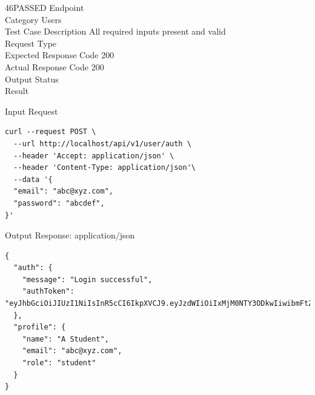 
\begin{testcase}{46}{PASSED}
Endpoint \hfill {}\\
Category \hfill Users\\
Test Case Description \hfill All required inputs present and valid\\

Request Type    \hfill {}\\
Expected Response Code    \hfill 200\\
Actual Response Code    \hfill 200\\

Output Status \hfill {}\\
Result \hfill {}

\begin{ipblock}{Input Request}
\begin{verbatim}
curl --request POST \
  --url http://localhost/api/v1/user/auth \
  --header 'Accept: application/json' \
  --header 'Content-Type: application/json'\
  --data '{
  "email": "abc@xyz.com",
  "password": "abcdef",
}'
\end{verbatim}
\end{ipblock}

\begin{opblock}{Output Response: application/json}
\begin{verbatim}
{
  "auth": {
    "message": "Login successful",
    "authToken": "eyJhbGciOiJIUzI1NiIsInR5cCI6IkpXVCJ9.eyJzdWIiOiIxMjM0NTY3ODkwIiwibmFtZSI6IkpvaG4gRG9lIiwiaWF0IjoxNTE2MjM5MDIyfQ.SflKxwRJSMeKKF2QT4fwpMeJf36POk6yJV_adQssw5c"
  },
  "profile": {
    "name": "A Student",
    "email": "abc@xyz.com",
    "role": "student"
  }
}
\end{verbatim}
\end{opblock}
\end{testcase}

